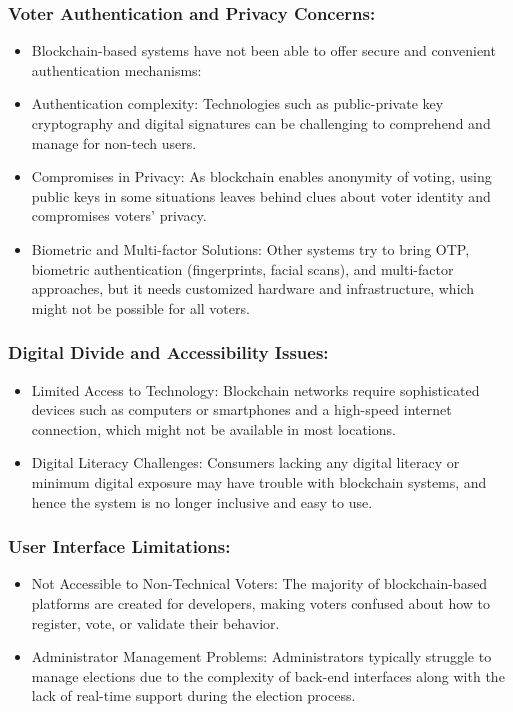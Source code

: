 \documentclass[conference]{IEEEtran}
\begin{document}
\subsubsection{Voter Authentication and Privacy Concerns: }
 
  \begin{itemize}
     \item Blockchain-based systems have not been able to offer secure and convenient authentication mechanisms:
    \item Authentication complexity: Technologies such as public-private key cryptography and digital signatures can be challenging to comprehend and manage for non-tech users.
    \item Compromises in Privacy: As blockchain enables anonymity of voting, using public keys in some situations leaves behind clues about voter identity and compromises voters' privacy.
    \item Biometric and Multi-factor Solutions: Other systems try to bring OTP, biometric authentication (fingerprints, facial scans), and multi-factor approaches, but it needs customized hardware and infrastructure, which might not be possible for all voters.
  \end{itemize}

\subsubsection{Digital Divide and Accessibility Issues:}

  \begin{itemize}
      \item Limited Access to Technology: Blockchain networks require sophisticated devices such as computers or smartphones and a high-speed internet connection, which might not be available in most locations.
    \item Digital Literacy Challenges: Consumers lacking any digital literacy or minimum digital exposure may have trouble with blockchain systems, and hence the system is no longer inclusive and easy to use.
  \end{itemize}

  
\subsubsection{User Interface Limitations:}

  \begin{itemize}
      \item Not Accessible to Non-Technical Voters: The majority of blockchain-based platforms are created for developers, making voters confused about how to register, vote, or validate their behavior.
\item Administrator Management Problems: Administrators typically struggle to manage elections due to the complexity of back-end interfaces along with the lack of real-time support during the election process.
  \end{itemize}
\end{document}

